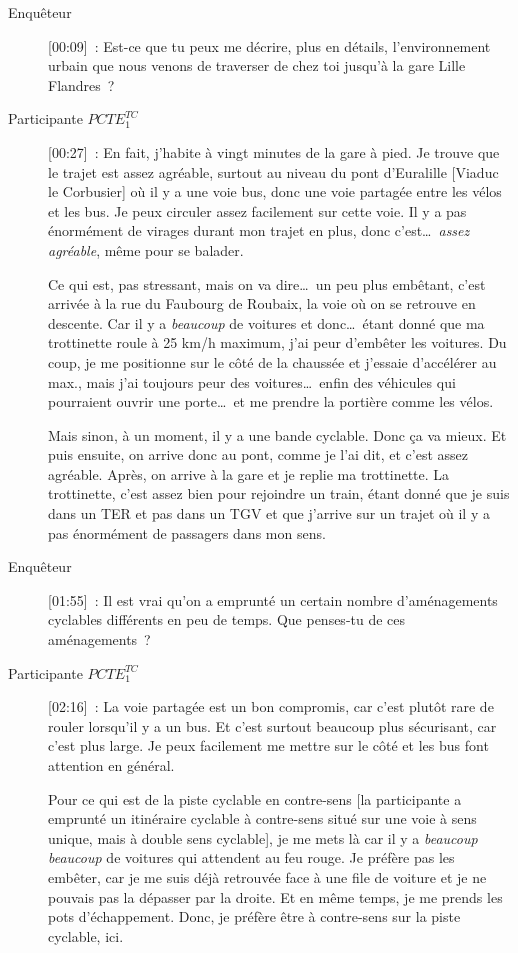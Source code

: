 \begin{description}
    \item[Enquêteur] [00:09]~: Est-ce que tu peux me décrire, plus en détails, l’environnement urbain que nous venons de traverser de chez toi jusqu'à la gare Lille Flandres~?
    \item[Participante \(PCTE^{TC}_{1}\)] [00:27]~: En fait, j’habite à vingt minutes de la gare à pied. Je trouve que le trajet est assez agréable, surtout au niveau du pont d’Euralille [Viaduc le Corbusier] où il y a une voie bus, donc une voie partagée entre les vélos et les bus. Je peux circuler assez facilement sur cette voie. Il y a pas énormément de virages durant mon trajet en plus, donc c’est\dots~\textsl{assez agréable}, même pour se balader.%
    
    Ce qui est, pas stressant, mais on va dire\dots~un peu plus embêtant, c’est arrivée à la rue du Faubourg de Roubaix, la voie où on se retrouve en descente. Car il y a \textsl{beaucoup} de voitures et donc\dots~étant donné que ma trottinette roule à 25 km/h maximum, j’ai peur d’embêter les voitures. Du coup, je me positionne sur le côté de la chaussée et j’essaie d’accélérer au max., mais j’ai toujours peur des voitures\dots~enfin des véhicules qui pourraient ouvrir une porte\dots~et me prendre la portière comme les vélos.%
    
    Mais sinon, à un moment, il y a une bande cyclable. Donc ça va mieux. Et puis ensuite, on arrive donc au pont, comme je l’ai dit, et c’est assez agréable. Après, on arrive à la gare et je replie ma trottinette. La trottinette, c’est assez bien pour rejoindre un train, étant donné que je suis dans un TER et pas dans un TGV et que j’arrive sur un trajet où il y a pas énormément de passagers dans mon sens.
    \item[Enquêteur] [01:55]~: Il est vrai qu'on a emprunté un certain nombre d'aménagements cyclables différents en peu de temps. Que penses-tu de ces aménagements~?
    \item[Participante \(PCTE^{TC}_{1}\)] [02:16]~: La voie partagée est un bon compromis, car c’est plutôt rare de rouler lorsqu’il y a un bus. Et c’est surtout beaucoup plus sécurisant, car c’est plus large. Je peux facilement me mettre sur le côté et les bus font attention en général.%
    
    Pour ce qui est de la piste cyclable en contre-sens [la participante a emprunté un itinéraire cyclable à contre-sens situé sur une voie à sens unique, mais à double sens cyclable], je me mets là car il y a \textsl{beaucoup beaucoup} de voitures qui attendent au feu rouge. Je préfère pas les embêter, car je me suis déjà retrouvée face à une file de voiture et je ne pouvais pas la dépasser par la droite. Et en même temps, je me prends les pots d’échappement. Donc, je préfère être à contre-sens sur la piste cyclable, ici.%
    

\end{description}
